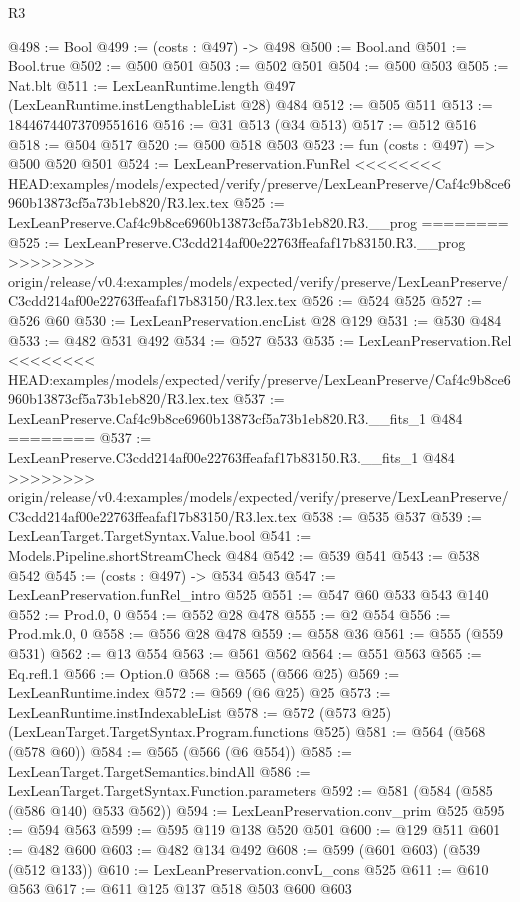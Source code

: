 \begin{lexlean}{R3}
\begin{coremodule}
{{{{{{{{{{{{{{{{{{{{{{{{{{@498 := Bool
@499 := (costs : @497) -> @498
@500 := Bool.and
@501 := Bool.true
@502 := @500 @501
@503 := @502 @501
@504 := @500 @503
@505 := Nat.blt
@511 := LexLeanRuntime.length @497 (LexLeanRuntime.instLengthableList @28) @484
@512 := @505 @511
@513 := 18446744073709551616
@516 := @31 @513 (@34 @513)
@517 := @512 @516
@518 := @504 @517
@520 := @500 @518 @503
@523 := fun (costs : @497) => @500 @520 @501
@524 := LexLeanPreservation.FunRel
<<<<<<<< HEAD:examples/models/expected/verify/preserve/LexLeanPreserve/Caf4c9b8ce6960b13873cf5a73b1eb820/R3.lex.tex
@525 := LexLeanPreserve.Caf4c9b8ce6960b13873cf5a73b1eb820.R3.__prog
========
@525 := LexLeanPreserve.C3cdd214af00e22763ffeafaf17b83150.R3.__prog
>>>>>>>> origin/release/v0.4:examples/models/expected/verify/preserve/LexLeanPreserve/C3cdd214af00e22763ffeafaf17b83150/R3.lex.tex
@526 := @524 @525
@527 := @526 @60
@530 := LexLeanPreservation.encList @28 @129
@531 := @530 @484
@533 := @482 @531 @492
@534 := @527 @533
@535 := LexLeanPreservation.Rel
<<<<<<<< HEAD:examples/models/expected/verify/preserve/LexLeanPreserve/Caf4c9b8ce6960b13873cf5a73b1eb820/R3.lex.tex
@537 := LexLeanPreserve.Caf4c9b8ce6960b13873cf5a73b1eb820.R3.__fits_1 @484
========
@537 := LexLeanPreserve.C3cdd214af00e22763ffeafaf17b83150.R3.__fits_1 @484
>>>>>>>> origin/release/v0.4:examples/models/expected/verify/preserve/LexLeanPreserve/C3cdd214af00e22763ffeafaf17b83150/R3.lex.tex
@538 := @535 @537
@539 := LexLeanTarget.TargetSyntax.Value.bool
@541 := Models.Pipeline.shortStreamCheck @484
@542 := @539 @541
@543 := @538 @542
@545 := (costs : @497) -> @534 @543
@547 := LexLeanPreservation.funRel_intro @525
@551 := @547 @60 @533 @543 @140
@552 := Prod.{0, 0}
@554 := @552 @28 @478
@555 := @2 @554
@556 := Prod.mk.{0, 0}
@558 := @556 @28 @478
@559 := @558 @36
@561 := @555 (@559 @531)
@562 := @13 @554
@563 := @561 @562
@564 := @551 @563
@565 := Eq.refl.{1}
@566 := Option.{0}
@568 := @565 (@566 @25)
@569 := LexLeanRuntime.index
@572 := @569 (@6 @25) @25
@573 := LexLeanRuntime.instIndexableList
@578 := @572 (@573 @25) (LexLeanTarget.TargetSyntax.Program.functions @525)
@581 := @564 (@568 (@578 @60))
@584 := @565 (@566 (@6 @554))
@585 := LexLeanTarget.TargetSemantics.bindAll
@586 := LexLeanTarget.TargetSyntax.Function.parameters
@592 := @581 (@584 (@585 (@586 @140) @533 @562))
@594 := LexLeanPreservation.conv_prim @525
@595 := @594 @563
@599 := @595 @119 @138 @520 @501
@600 := @129 @511
@601 := @482 @600
@603 := @482 @134 @492
@608 := @599 (@601 @603) (@539 (@512 @133))
@610 := LexLeanPreservation.convL_cons @525
@611 := @610 @563
@617 := @611 @125 @137 @518 @503 @600 @603
}}}}}}}}}}}}}}}}}}}}}}}}}}
\end{coremodule}
\end{lexlean}
